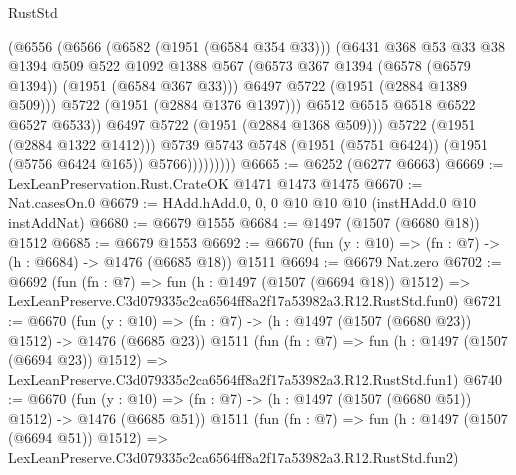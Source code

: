 \begin{lexlean}{RustStd}
\begin{coremodule}
                            (@6556
                              (@6566
                                (@6582 (@1951 (@6584 @354 @33)))
                                (@6431
                                  @368
                                  @53
                                  @33
                                  @38
                                  @1394
                                  @509
                                  @522
                                  @1092
                                  @1388
                                  @567
                                  (@6573 @367 @1394 (@6578 (@6579 @1394)) (@1951 (@6584 @367 @33)))
                                  @6497
                                  @5722
                                  (@1951 (@2884 @1389 @509)))
                                @5722
                                (@1951 (@2884 @1376 @1397)))
                              @6512
                              @6515
                              @6518
                              @6522
                              @6527
                              @6533))
                          @6497
                          @5722
                          (@1951 (@2884 @1368 @509)))
                        @5722
                        (@1951 (@2884 @1322 @1412)))
                      @5739
                      @5743
                      @5748
                      (@1951 (@5751 @6424))
                      (@1951 (@5756 @6424 @165))
                      @5766)))))))))
@6665 := @6252 (@6277 @6663)
@6669 := LexLeanPreservation.Rust.CrateOK @1471 @1473 @1475
@6670 := Nat.casesOn.{0}
@6679 := HAdd.hAdd.{0, 0, 0} @10 @10 @10 (instHAdd.{0} @10 instAddNat)
@6680 := @6679 @1555
@6684 := @1497 (@1507 (@6680 @18)) @1512
@6685 := @6679 @1553
@6692 := @6670 (fun (y : @10) => (fn : @7) -> (h : @6684) -> @1476 (@6685 @18)) @1511
@6694 := @6679 Nat.zero
@6702 := @6692
    (fun (fn : @7) =>
    fun (h : @1497 (@1507 (@6694 @18)) @1512) =>
    LexLeanPreserve.C3d079335c2ca6564ff8a2f17a53982a3.R12.RustStd.fun0)
@6721 := @6670
    (fun (y : @10) => (fn : @7) -> (h : @1497 (@1507 (@6680 @23)) @1512) -> @1476 (@6685 @23))
    @1511
    (fun (fn : @7) =>
    fun (h : @1497 (@1507 (@6694 @23)) @1512) =>
    LexLeanPreserve.C3d079335c2ca6564ff8a2f17a53982a3.R12.RustStd.fun1)
@6740 := @6670
    (fun (y : @10) => (fn : @7) -> (h : @1497 (@1507 (@6680 @51)) @1512) -> @1476 (@6685 @51))
    @1511
    (fun (fn : @7) =>
    fun (h : @1497 (@1507 (@6694 @51)) @1512) =>
    LexLeanPreserve.C3d079335c2ca6564ff8a2f17a53982a3.R12.RustStd.fun2)

\end{coremodule}
\end{lexlean}
